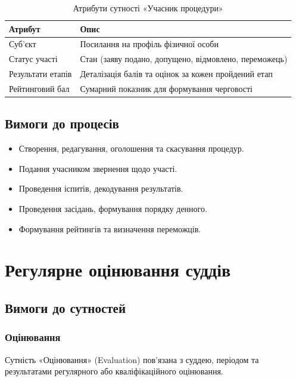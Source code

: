 \documentclass{article}
\begin{document}
\begin{table}[ht]
\caption{Атрибути сутності «Учасник процедури»}
\begin{tabular}{p{5cm}p{9cm}}
\hline
\textbf{Атрибут} & \textbf{Опис} \\
\hline
Суб'єкт & Посилання на профіль фізичної особи \\
Статус участі & Стан (заяву подано, допущено, відмовлено, переможець) \\
Результати етапів & Деталізація балів та оцінок за кожен пройдений етап \\
Рейтинговий бал & Сумарний показник для формування черговості \\
\hline
\end{tabular}
\end{table}

\subsection{Вимоги до процесів}

\begin{itemize}
\item Створення, редагування, оголошення та скасування процедур.
\item Подання учасником звернення щодо участі.
\item Проведення іспитів, декодування результатів.
\item Проведення засідань, формування порядку денного.
\item Формування рейтингів та визначення переможців.
\end{itemize}

\newpage
\section{Регулярне оцінювання суддів}

\subsection{Вимоги до сутностей}

\subsubsection{Оцінювання}
Сутність «Оцінювання» (Evaluation) пов’язана з суддею, періодом та результатами регулярного або кваліфікаційного оцінювання.
\end{document}
